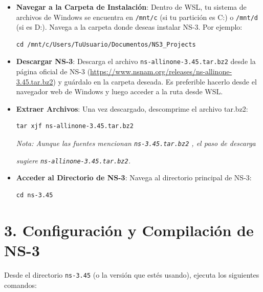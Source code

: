 \documentclass{article}
\begin{document}
\begin{itemize}
    \item \textbf{Navegar a la Carpeta de Instalación}: Dentro de WSL, tu sistema de archivos de Windows se encuentra en \texttt{/mnt/c} (si tu partición es C:) o \texttt{/mnt/d} (si es D:). Navega a la carpeta donde deseas instalar NS-3. Por ejemplo:
    \begin{lstlisting}
cd /mnt/c/Users/TuUsuario/Documentos/NS3_Projects
    \end{lstlisting}
    \item \textbf{Descargar NS-3}: Descarga el archivo \texttt{ns-allinone-3.45.tar.bz2} desde la página oficial de NS-3 (\url{https://www.nsnam.org/releases/ns-allinone-3.45.tar.bz2}) y guárdalo en la carpeta deseada. Es preferible hacerlo desde el navegador web de Windows y luego acceder a la ruta desde WSL.
    \item \textbf{Extraer Archivos}: Una vez descargado, descomprime el archivo tar.bz2:
    \begin{lstlisting}
tar xjf ns-allinone-3.45.tar.bz2
    \end{lstlisting}
    \textit{Nota: Aunque las fuentes mencionan \texttt{ns-3.45.tar.bz2} , el paso de descarga}

        \textit{sugiere \texttt{ns-allinone-3.45.tar.bz2}.}
    \item \textbf{Acceder al Directorio de NS-3}: Navega al directorio principal de NS-3:
    \begin{lstlisting}
cd ns-3.45
    \end{lstlisting}
\end{itemize}

\section*{\textbf{3. Configuración y Compilación de NS-3}}

Desde el directorio \texttt{ns-3.45} (o la versión que estés usando), ejecuta los siguientes comandos:
\end{document}
